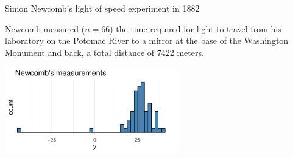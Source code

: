 \documentclass[10pt,handout]{beamer}
\begin{document}
\begin{frame}{Simon Newcomb's light of speed experiment in 1882}

  {\small
  Newcomb measured ($n=66$) the time required for light to travel from
  his laboratory on the Potomac River to a mirror at the base of the
  Washington Monument and back, a total distance of 7422 meters.}
  \begin{center}
    \vspace{-0.5\baselineskip}
    {\includegraphics[width=7.5cm]{figs/newcomb_data.pdf}}\\
    \vspace{-1\baselineskip}
  \end{center}

\end{frame}
\end{document}
